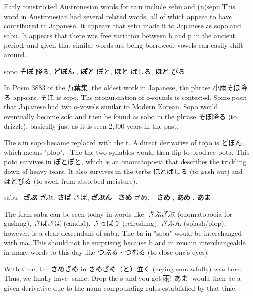 \par{ Early constructed Austronesian words for rain include sebu and (n)sepu.This word in Austronesian had several related words, all of which appear to have contributed to Japanese. It appears that sebu made it to Japanese as sopo and sabu. It appears that there was free variation between b and p in the ancient period, and given that similar words are being borrowed, vowels can easily shift around. }

\begin{center}
 sopo \textrightarrow  \textbf{そぼ }降る, \textbf{どぼん }, \textbf{ぽと }ぽと, \textbf{ほと }ばしる, \textbf{ほと }びる 
\end{center}

\par{ In Poem 3883 of the 万葉集, the oldest work in Japanese, the phrase 小雨そほ降る appears. そほ is sopo. The pronunciation of o-sounds is contested. Some posit that Japanese had two o-vowels similar to Modern Korean. Sopo would eventually become sofo and then be found as sobo in the phrase そぼ降る (to drizzle), basically just as it is seen 2,000 years in the past. }

\par{ The s in sopo became replaced with the t. A direct derivative of topo is どぼん, which means "plop".  The the two syllables would then flip to produce poto. This poto survives in ぽとぽと, which is an onomatopoeia that describes the trickling down of heavy tears. It also survives in the verbs ほとばしる (to gush out) and ほとびる (to swell from absorbed moisture). }

\begin{center}
sabu  \textrightarrow  \textbf{ざぶ }ざぶ, \textbf{さば }さば, \textbf{ざぶん }, \textbf{さめ }ざめ, - \textbf{さめ }, \textbf{あめ }, \textbf{あま }- 
\end{center}

\par{ The form sabu can be seen today in words like ざぶざぶ (onomatopoeia for gushing), さばさば (candid), さっぱり (refreshing). ざぶん (splash\slash plop), however, is a clear descendant of sabu. The ba in "saba" would be interchanged with ma. This should not be surprising because b and m remain interchangeable in many words to this day like つぶる・つむる (to close one's eyes). }

\par{ With time, the さめざめ in さめざめ（と）泣く (crying sorrowfully) was born. Thus, we finally have -same. Drop the s and you get 雨! あま- would then be a given derivative due to the noun compounding rules established by that time. }

